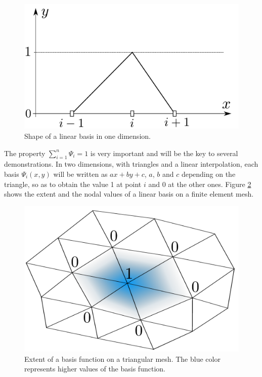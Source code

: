 \begin{figure}[H]%
\centering
\includegraphics[scale=0.4]
{graphics/linear_basis_1D.pdf}
\caption{Shape of a linear basis in one dimension.}%
\label{base en 1D}%
\end{figure}


The property $\sum\nolimits_{i=1}^{n}\Psi_{i}=1$ is very important and will be
the key to several demonstrations. In two dimensions, with triangles and a
linear interpolation, each basis $\Psi_{i}(x,y)$ will be written as $ax+by+c$,
$a$, $b$ and $c$ depending on the triangle, so as to obtain the value 1 at
point $i$ and 0 at the other ones. Figure \ref{emprise base} shows the extent
and the nodal values of a linear basis on a finite element mesh.%

\begin{figure}[H]%
\centering
\includegraphics[scale=0.4]
{graphics/linear_basis_2D.pdf}%
\caption{Extent of a basis function on a triangular mesh. The blue color represents higher values of the basis function.}%
\label{emprise base}%
\end{figure}

